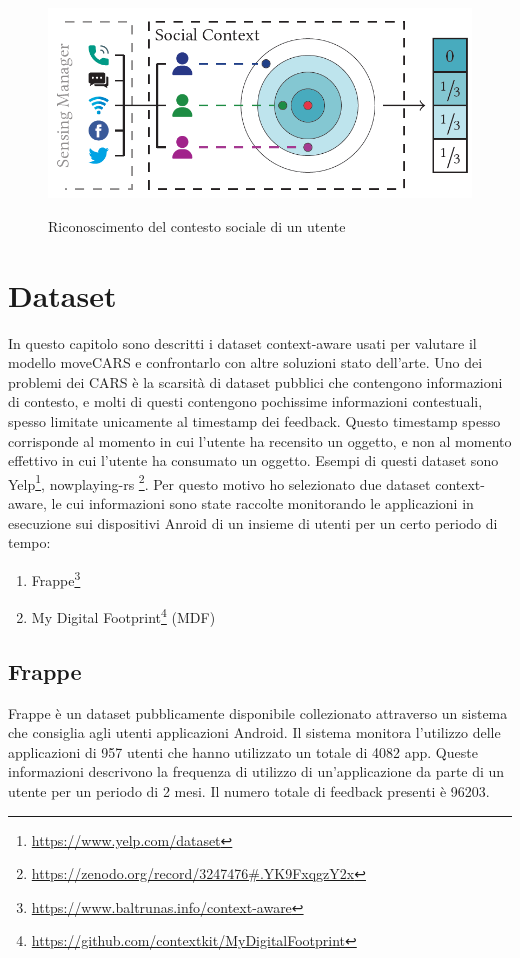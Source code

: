 \documentclass[12pt,italian]{report}
\begin{document}
\begin{figure}
  \centering
  \includegraphics[scale=0.80]{immagini/ego-array.png}
  \caption{Riconoscimento del contesto sociale di un utente}
  \label{fig:ego-array}	
  \cite{ego-net}
\end{figure}

% 
% 

\chapter{Dataset} \label{chap:datasets}
In questo capitolo sono descritti i dataset context-aware usati per valutare il modello moveCARS e confrontarlo con altre soluzioni stato dell'arte. Uno dei problemi dei CARS è la scarsità di dataset pubblici che contengono informazioni di contesto, e molti di questi contengono pochissime informazioni contestuali, spesso limitate unicamente al timestamp dei feedback. Questo timestamp spesso corrisponde al momento in cui l'utente ha recensito un oggetto, e non al momento effettivo in cui l'utente ha consumato un oggetto. Esempi di questi dataset sono Yelp\footnote{\url{https://www.yelp.com/dataset}}, nowplaying-rs \footnote{\url{https://zenodo.org/record/3247476\#.YK9FxqgzY2x}}. Per questo motivo ho selezionato due dataset context-aware, le cui informazioni sono state raccolte monitorando le applicazioni in esecuzione sui dispositivi Anroid di un insieme di utenti per un certo periodo di tempo:

\begin{enumerate}
\item Frappe\footnote{\url{https://www.baltrunas.info/context-aware}} 
\item My Digital Footprint\footnote{\url{https://github.com/contextkit/MyDigitalFootprint}} (MDF)    
\end{enumerate}

\section{Frappe}
Frappe \cite{frappe} è un dataset pubblicamente disponibile collezionato attraverso un sistema che consiglia agli utenti applicazioni Android. Il sistema monitora l'utilizzo delle applicazioni di 957 utenti che hanno utilizzato un totale di 4082 app. Queste informazioni descrivono la frequenza di utilizzo di un'applicazione da parte di un utente per un periodo di 2 mesi. Il numero totale di feedback presenti è 96203.
\end{document}
